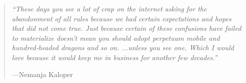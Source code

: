 \begin{quote}
    \textit{``These days you see a lot of crap on the internet asking for the abandonment of all rules because we had certain expectations and hopes that did not come true. Just because certain of these confusions have failed to materialize doesn't mean you should adopt perpetuum mobile and hundred-headed dragons and so on.
    \newline
    ...unless you see one. Which I would love because it would keep me in business for another few decades.''}
    
    ---Nemanja Kaloper
\end{quote}

